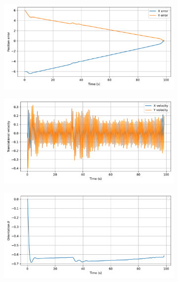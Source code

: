 \begin{figure}[h]
    \centering
    \begin{subfigure}{0.45\linewidth}
        \centering
        \includegraphics[width=\linewidth]{figures/Simulations/sim1circles/evolution_0.pdf}
    \end{subfigure}
    \begin{subfigure}{0.45\linewidth}
        \centering
        \includegraphics[width=\linewidth]{figures/Simulations/sim1circles/evolution_1.pdf}
    \end{subfigure}
    \hfill
    \begin{subfigure}{0.45\linewidth}
        \centering
        \includegraphics[width=\linewidth]{figures/Simulations/sim1circles/evolution_2.pdf}

\end{subfigure}
\end{figure}
